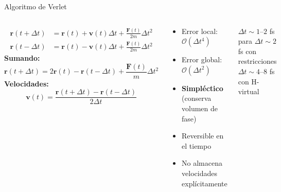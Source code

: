 \documentclass[aspectratio=169, 10pt]{beamer}
\begin{document}
\begin{frame}{Algoritmo de Verlet}
\begin{columns}[T]
\begin{tcolorbox}[formulabox, title={Expansión de Taylor}]
\small
\begin{align*}
\mathbf{r}(t+\Delta t) &= \mathbf{r}(t) + \mathbf{v}(t)\Delta t + \frac{\mathbf{F}(t)}{2m}\Delta t^2 \\
\mathbf{r}(t-\Delta t) &= \mathbf{r}(t) - \mathbf{v}(t)\Delta t + \frac{\mathbf{F}(t)}{2m}\Delta t^2
\end{align*}
\textbf{Sumando:}
\[
\mathbf{r}(t+\Delta t) = 2\mathbf{r}(t) - \mathbf{r}(t-\Delta t) + \frac{\mathbf{F}(t)}{m}\Delta t^2
\]
\textbf{Velocidades:}
\[
\mathbf{v}(t) = \frac{\mathbf{r}(t+\Delta t) - \mathbf{r}(t-\Delta t)}{2\Delta t}
\]
\end{tcolorbox}

\begin{tcolorbox}[warningbox, title={Propiedades}]
\small
\begin{itemize}
  \item Error local: $\mathcal{O}(\Delta t^4)$
  \item Error global: $\mathcal{O}(\Delta t^2)$
  \item \textbf{Simpléctico} (conserva volumen de fase)
  \item Reversible en el tiempo
  \item No almacena velocidades explícitamente
\end{itemize}
\end{tcolorbox}
\vspace{0.3em}
\begin{tcolorbox}[definitionbox, title={Paso de tiempo típico}]
\small
$\Delta t \sim 1\text{--}2$ fs para  \newline
$\Delta t \sim 2$ fs con restricciones \newline
$\Delta t \sim 4\text{--}8$ fs con H-virtual
\end{tcolorbox}
\end{columns}
\end{frame}
\end{document}
